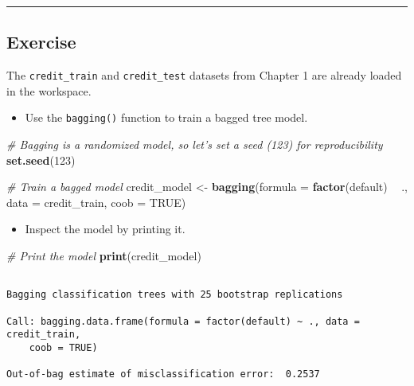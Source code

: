 \documentclass[
]{book}
\newenvironment{Shaded}{\begin{snugshade}}{\end{snugshade}}
\newcommand{\CommentTok}[1]{\textcolor[rgb]{0.56,0.35,0.01}{\textit{#1}}}
\newcommand{\DataTypeTok}[1]{\textcolor[rgb]{0.13,0.29,0.53}{#1}}
\newcommand{\DecValTok}[1]{\textcolor[rgb]{0.00,0.00,0.81}{#1}}
\newcommand{\KeywordTok}[1]{\textcolor[rgb]{0.13,0.29,0.53}{\textbf{#1}}}
\newcommand{\NormalTok}[1]{#1}
\newcommand{\OperatorTok}[1]{\textcolor[rgb]{0.81,0.36,0.00}{\textbf{#1}}}
\newcommand{\OtherTok}[1]{\textcolor[rgb]{0.56,0.35,0.01}{#1}}
\newcommand{\StringTok}[1]{\textcolor[rgb]{0.31,0.60,0.02}{#1}}
\providecommand{\tightlist}{%
  \setlength{\itemsep}{0pt}\setlength{\parskip}{0pt}}
\begin{document}
\begin{center}\rule{0.5\linewidth}{0.5pt}\end{center}

\hypertarget{exercise-11}{%
\subsection*{Exercise}\label{exercise-11}}

The \texttt{credit\_train} and \texttt{credit\_test} datasets from Chapter 1 are already loaded in the workspace.

\begin{itemize}
\tightlist
\item
  Use the \texttt{bagging()} function to train a bagged tree model.
\end{itemize}

\begin{Shaded}
\begin{Highlighting}[]
\CommentTok{# Bagging is a randomized model, so let's set a seed (123) for reproducibility}
\KeywordTok{set.seed}\NormalTok{(}\DecValTok{123}\NormalTok{)}

\CommentTok{# Train a bagged model}
\NormalTok{credit_model <-}\StringTok{ }\KeywordTok{bagging}\NormalTok{(}\DataTypeTok{formula =} \KeywordTok{factor}\NormalTok{(default) }\OperatorTok{~}\StringTok{ }\NormalTok{., }
                        \DataTypeTok{data =}\NormalTok{ credit_train,}
                        \DataTypeTok{coob =} \OtherTok{TRUE}\NormalTok{)}
\end{Highlighting}
\end{Shaded}

\begin{itemize}
\tightlist
\item
  Inspect the model by printing it.
\end{itemize}

\begin{Shaded}
\begin{Highlighting}[]
\CommentTok{# Print the model}
\KeywordTok{print}\NormalTok{(credit_model)}
\end{Highlighting}
\end{Shaded}

\begin{verbatim}

Bagging classification trees with 25 bootstrap replications 

Call: bagging.data.frame(formula = factor(default) ~ ., data = credit_train, 
    coob = TRUE)

Out-of-bag estimate of misclassification error:  0.2537 
\end{verbatim}
\end{document}
